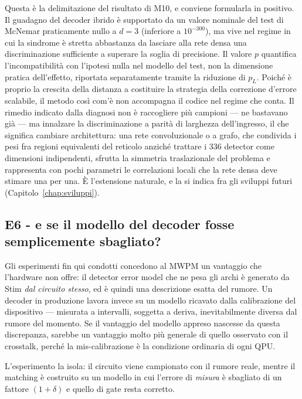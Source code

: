 Questa è la delimitazione del risultato di M10, e conviene formularla in positivo. Il guadagno del decoder ibrido è supportato da un valore nominale del test di McNemar praticamente nullo a $d=3$ (inferiore a $10^{-300}$), ma vive nel regime in cui la sindrome è stretta abbastanza da lasciare alla rete densa una discriminazione sufficiente a superare la soglia di precisione. Il valore $p$ quantifica l'incompatibilità con l'ipotesi nulla nel modello del test, non la dimensione pratica dell'effetto, riportata separatamente tramite la riduzione di $p_L$. Poiché è proprio la crescita della distanza a costituire la strategia della correzione d'errore scalabile, il metodo così com'è non accompagna il codice nel regime che conta. Il rimedio indicato dalla diagnosi non è raccogliere più campioni --- ne bastavano già --- ma innalzare la discriminazione a parità di larghezza dell'ingresso, il che significa cambiare architettura: una rete convoluzionale o a grafo, che condivida i pesi fra regioni equivalenti del reticolo anziché trattare i $336$ detector come dimensioni indipendenti, sfrutta la simmetria traslazionale del problema e rappresenta con pochi parametri le correlazioni locali che la rete densa deve stimare una per una. È l'estensione naturale, e la si indica fra gli sviluppi futuri (Capitolo~\ref{chap:sviluppi}).

\subsection[E6 - modello del decoder errato?]{E6 - e se il modello del decoder fosse semplicemente sbagliato?}
\label{subsec:neural_miscalibrato}

Gli esperimenti fin qui condotti concedono al \ac{MWPM} un vantaggio che l'hardware non offre: il detector error model che ne pesa gli archi è generato da Stim \emph{dal circuito stesso}, ed è quindi una descrizione esatta del rumore. Un decoder in produzione lavora invece su un modello ricavato dalla calibrazione del dispositivo --- misurata a intervalli, soggetta a deriva, inevitabilmente diversa dal rumore del momento. Se il vantaggio del modello appreso nascesse da questa discrepanza, sarebbe un vantaggio molto più generale di quello osservato con il crosstalk, perché la mis-calibrazione è la condizione ordinaria di ogni \ac{QPU}.

L'esperimento la isola: il circuito viene campionato con il rumore reale, mentre il matching è costruito su un modello in cui l'errore di \emph{misura} è sbagliato di un fattore $(1+\delta)$ e quello di gate resta corretto.

